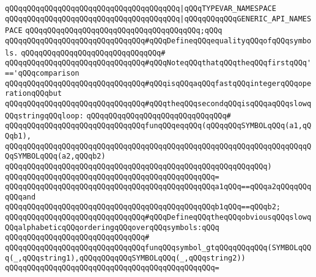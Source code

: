 \verb|qQQqqQQqqQQqqQQqqQQqqQQqqQQqqQQqqQQqqQQq|\verb#|qQQqTYPEVAR_NAMESPACE#\newline
\verb|qQQqqQQqqQQqqQQqqQQqqQQqqQQqqQQqqQQqqQQq|\verb#|qQQqqQQqqQQqGENERIC_API_NAMESPACE#\newline
\verb|qQQqqQQqqQQqqQQqqQQqqQQqqQQqqQQqqQQqqQQq;qQQq|\newline
\newline
\newline
\newline
\verb|qQQqqQQqqQQqqQQqqQQqqQQqqQQqqQQq#qQQqDefineqQQqequalityqQQqofqQQqsymbols.|\newline
\verb|qQQqqQQqqQQqqQQqqQQqqQQqqQQqqQQq#|\newline
\verb|qQQqqQQqqQQqqQQqqQQqqQQqqQQqqQQq#qQQqNoteqQQqthatqQQqtheqQQqfirstqQQq'=='qQQqcomparison|\newline
\verb|qQQqqQQqqQQqqQQqqQQqqQQqqQQqqQQq#qQQqisqQQqaqQQqfastqQQqintegerqQQqoperationqQQqbut|\newline
\verb|qQQqqQQqqQQqqQQqqQQqqQQqqQQqqQQq#qQQqtheqQQqsecondqQQqisqQQqaqQQqslowqQQqstringqQQqloop:|\newline
\verb|qQQqqQQqqQQqqQQqqQQqqQQqqQQqqQQq#|\newline
\verb|qQQqqQQqqQQqqQQqqQQqqQQqqQQqqQQqfunqQQqeqqQQq(qQQqqQQqSYMBOLqQQq(a1,qQQqb1),|\newline
\verb|qQQqqQQqqQQqqQQqqQQqqQQqqQQqqQQqqQQqqQQqqQQqqQQqqQQqqQQqqQQqqQQqqQQqqQQqSYMBOLqQQq(a2,qQQqb2)|\newline
\verb|qQQqqQQqqQQqqQQqqQQqqQQqqQQqqQQqqQQqqQQqqQQqqQQqqQQqqQQqqQQq)|\newline
\verb|qQQqqQQqqQQqqQQqqQQqqQQqqQQqqQQqqQQqqQQqqQQqqQQq=|\newline
\verb|qQQqqQQqqQQqqQQqqQQqqQQqqQQqqQQqqQQqqQQqqQQqqQQqa1qQQq==qQQqa2qQQqqQQqqQQqand|\newline
\verb|qQQqqQQqqQQqqQQqqQQqqQQqqQQqqQQqqQQqqQQqqQQqqQQqb1qQQq==qQQqb2;|\newline
\newline
\newline
\newline
\verb|qQQqqQQqqQQqqQQqqQQqqQQqqQQqqQQq#qQQqDefineqQQqtheqQQqobviousqQQqslowqQQqalphabeticqQQqorderingqQQqoverqQQqsymbols:qQQq|\newline
\verb|qQQqqQQqqQQqqQQqqQQqqQQqqQQqqQQq#|\newline
\verb|qQQqqQQqqQQqqQQqqQQqqQQqqQQqqQQqfunqQQqsymbol_gtqQQqqQQqqQQq(SYMBOLqQQq(_,qQQqstring1),qQQqqQQqqQQqSYMBOLqQQq(_,qQQqstring2))|\newline
\verb|qQQqqQQqqQQqqQQqqQQqqQQqqQQqqQQqqQQqqQQqqQQqqQQq=|\newline
